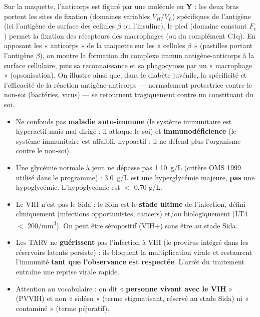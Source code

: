 \documentclass[11pt]{article}
\newcommand{\cle}[1]{{\popxbold\color{popdark}#1}}
\begin{document}
\begin{exoresolu}
Sur la maquette, l'anticorps est figuré par une molécule en \textbf{Y} : les deux bras portent les \cle{sites de fixation} (domaines variables $V_H/V_L$) spécifiques de l'antigène (ici l'antigène de surface des cellules $\beta$ ou l'insuline), le pied (domaine constant $F_c$) permet la fixation des récepteurs des macrophages (ou du complément C1q). En apposant les « anticorps » de la maquette sur les « cellules $\beta$ » (pastilles portant l'antigène $\beta$), on montre la formation du \cle{complexe immun} antigène-anticorps à la surface cellulaire, puis sa reconnaissance et sa phagocytose par un « macrophage » (opsonisation). On illustre ainsi que, dans le diabète juvénile, la spécificité et l'efficacité de la réaction antigène-anticorps — normalement protectrice contre le non-soi (bactéries, virus) — se retournent tragiquement contre un constituant du soi.
\end{exoresolu}

\begin{attention}
\begin{itemize}
\item Ne confonds pas \textbf{maladie auto-immune} (le système immunitaire est hyperactif mais mal dirigé : il attaque le soi) et \textbf{immunodéficience} (le système immunitaire est affaibli, hypoactif : il ne défend plus l'organisme contre le non-soi).
\item Une glycémie normale à jeun ne dépasse pas \SI{1,10}{g/L} (critère OMS 1999 utilisé dans le programme) : \SI{3,0}{g/L} est une hyperglycémie majeure, \textbf{pas} une hypoglycémie. L'hypoglycémie est $<$ 0,70 g/L.
\item Le VIH n'est pas le Sida : le Sida est le \textbf{stade ultime} de l'infection, défini cliniquement (infections opportunistes, cancers) et/ou biologiquement (LT4 $<$ 200/mm\textsuperscript{3}). On peut être séropositif (VIH+) sans être au stade Sida.
\item Les TARV ne \textbf{guérissent} pas l'infection à VIH (le provirus intégré dans les réservoirs latents persiste) : ils bloquent la multiplication virale et restaurent l'immunité \textbf{tant que l'observance est respectée}. L'arrêt du traitement entraîne une reprise virale rapide.
\item Attention au vocabulaire : on dit « \textbf{personne vivant avec le VIH} » (PVVIH) et non « sidéen » (terme stigmatisant, réservé au stade Sida) ni « contaminé » (terme péjoratif).
\end{itemize}
\end{attention}
\end{document}
